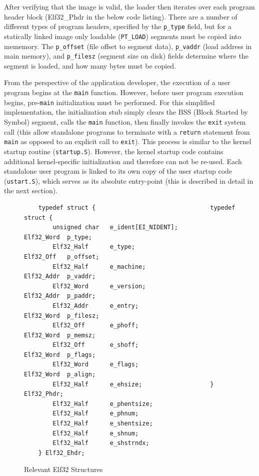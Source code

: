 \documentclass[titlepage]{article}
\begin{document}
After verifying that the image is valid, the loader then iterates over each
program header block (Elf32\_Phdr  in the below code listing). There are a
number of different types of program headers, specified by the \verb!p_type!
field, but for a statically linked image only loadable (\verb!PT_LOAD!)
segments must be copied into mememory. The \verb!p_offset!  (file offset to
segment data), \verb!p_vaddr!  (load address in main memory), and
\verb!p_filesz! (segment size on disk) fields determine where the segment is
loaded, and how many bytes must be copied.

From the perspective of the application developer, the execution of a user
program begins at the \verb!main! function. However, before user program 
execution begins, pre-\verb!main! initialization must be performed. For this
simplified implementation, the initialization stub simply clears the BSS
(Block Started by Symbol) segment, calls the \verb!main! function, then finally
invokes the \verb!exit! system call (this allow standalone programs to terminate
with a \verb!return! statement from \verb!main! as opposed to an explicit call
to \verb!exit!). This process is similar to the kernel startup routine
(\verb!startup.S!). However, the kernel startup code contains additional
kernel-specific initialization and therefore can not be re-used. Each standalone
user program is linked to its own copy of the user startup code
(\verb!ustart.S!), which serves as its absolute entry-point (this is described
in detail in the next section).

\begin{figure}[!h]
\begin{verbatim}
    typedef struct {                                typedef struct {
        unsigned char   e_ident[EI_NIDENT];             Elf32_Word  p_type;
        Elf32_Half      e_type;                         Elf32_Off   p_offset;
        Elf32_Half      e_machine;                      Elf32_Addr  p_vaddr;
        Elf32_Word      e_version;                      Elf32_Addr  p_paddr;
        Elf32_Addr      e_entry;                        Elf32_Word  p_filesz;
        Elf32_Off       e_phoff;                        Elf32_Word  p_memsz;
        Elf32_Off       e_shoff;                        Elf32_Word  p_flags;
        Elf32_Word      e_flags;                        Elf32_Word  p_align;
        Elf32_Half      e_ehsize;                   } Elf32_Phdr;
        Elf32_Half      e_phentsize;
        Elf32_Half      e_phnum;
        Elf32_Half      e_shentsize;
        Elf32_Half      e_shnum;
        Elf32_Half      e_shstrndx;
    } Elf32_Ehdr;
\end{verbatim}
\caption{Relevant Elf32 Structures}
\end{figure}
\end{document}
